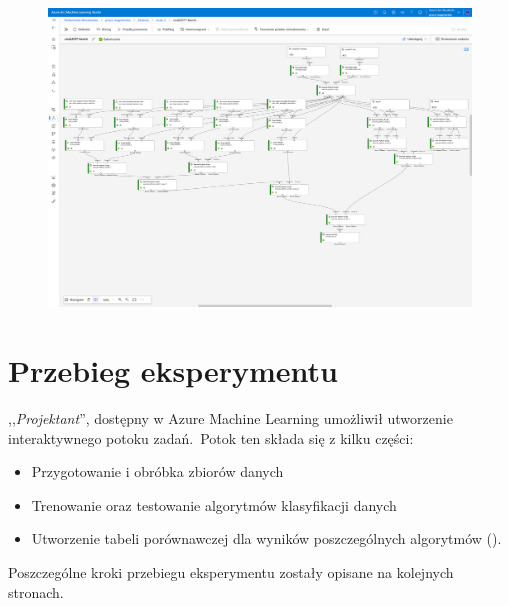 \begin{landscape}
    \centering
    \begin{figure}[H]
        \centering
        \includegraphics[height=0.9\textwidth]{images/pipeline}
        \label{fig:pipeline}
    \end{figure}
\end{landscape}



\section{Przebieg eksperymentu}

,,\textit{Projektant}'', dostępny w Azure Machine Learning umożliwił utworzenie interaktywnego potoku zadań.\ Potok ten składa się z kilku części:
\begin{itemize}
    \item Przygotowanie i obróbka zbiorów danych
    \item Trenowanie oraz testowanie algorytmów klasyfikacji danych
    \item Utworzenie tabeli porównawczej dla wyników poszczególnych algorytmów ().
\end{itemize}

Poszczególne kroki przebiegu eksperymentu zostały opisane na kolejnych stronach.

